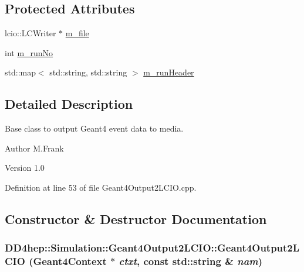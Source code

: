 \subsection*{Protected Attributes}
\begin{DoxyCompactItemize}
\item 
lcio::LCWriter $\ast$ \hyperlink{class_d_d4hep_1_1_simulation_1_1_geant4_output2_l_c_i_o_a53ad4cd77ad5b3b95105cee1ac2ca6f8}{m\_\-file}
\item 
int \hyperlink{class_d_d4hep_1_1_simulation_1_1_geant4_output2_l_c_i_o_a6f4cb683c0f3b248ee518aa9ca7cf0c6}{m\_\-runNo}
\item 
std::map$<$ std::string, std::string $>$ \hyperlink{class_d_d4hep_1_1_simulation_1_1_geant4_output2_l_c_i_o_ad4dec33a908a569451f8f51eb3954eba}{m\_\-runHeader}
\end{DoxyCompactItemize}


\subsection{Detailed Description}
Base class to output Geant4 event data to media. \begin{DoxyAuthor}{Author}
M.Frank 
\end{DoxyAuthor}
\begin{DoxyVersion}{Version}
1.0 
\end{DoxyVersion}


Definition at line 53 of file Geant4Output2LCIO.cpp.

\subsection{Constructor \& Destructor Documentation}
\hypertarget{class_d_d4hep_1_1_simulation_1_1_geant4_output2_l_c_i_o_ad8de2b534bab1a13d694cb8fc48103f3}{
\subsubsection[{Geant4Output2LCIO}]{\setlength{\rightskip}{0pt plus 5cm}DD4hep::Simulation::Geant4Output2LCIO::Geant4Output2LCIO ({\bf Geant4Context} $\ast$ {\em ctxt}, \/  const std::string \& {\em nam})}}
\label{class_d_d4hep_1_1_simulation_1_1_geant4_output2_l_c_i_o_ad8de2b534bab1a13d694cb8fc48103f3}


